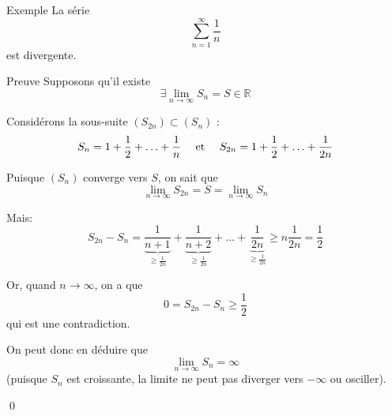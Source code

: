 \documentclass[a4paper]{article}
\begin{document}
\begin{parag}{Exemple}
    La série 
    \[\sum_{n=1}^{\infty} \frac{1}{n}\]
    est divergente. 

    \begin{subparag}{Preuve}
        Supposons qu'il existe 
        \[\exists \lim_{n \to \infty} S_n = S \in \mathbb{R}\]
        
        Considérons la sous-suite $\left(S_{2n}\right) \subset \left(S_n\right)$ : 
        \[S_n = 1 + \frac{1}{2} + \ldots + \frac{1}{n} \quad \text{ et } \quad S_{2n} = 1 + \frac{1}{2} + \ldots + \frac{1}{2n}\]
        
        Puisque $\left(S_n\right)$ converge vers $S$, on sait que 
        \[\lim_{n \to \infty} S_{2n} = S = \lim_{n \to \infty} S_n\]
        
        Mais: 
        \[S_{2n} - S_n = \underbrace{\frac{1}{n+1}}_{\geq \frac{1}{2n}} + \underbrace{\frac{1}{n+2}}_{\geq \frac{1}{2n}} + \ldots + \underbrace{\frac{1}{2n}}_{\geq \frac{1}{2n}} \geq n \frac{1}{2n} = \frac{1}{2}\]
        
        Or, quand $n \to \infty$, on a que 
        \[0 = S_{2n} - S_n \geq \frac{1}{2}\]
        qui est une contradiction.

        On peut donc en déduire que 
        \[\lim_{n \to \infty} S_n = \infty\]
        (puisque $S_n$ est croissante, la limite ne peut pas diverger vers $-\infty$ ou osciller).

        \qed
    \end{subparag}
\end{parag}
 
\end{document}
